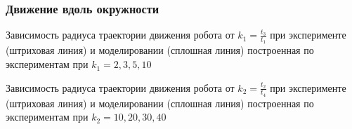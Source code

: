 \begin{frame}
\frametitle{Движение вдоль окружности}


\begin{minipage}[t]{0.47\linewidth}
	{Зависимость радиуса траектории движения робота от $k_1 = \frac{t_3}{t_1}$ при эксперименте (штриховая линия) и моделировании (сплошная линия) построенная по экспериментам при $k_1 = 2, 3, 5, 10$}
	\center{\texttt{[image: kRDependence+Theor\_T=3,W=max.eps]}}
\end{minipage}
\hfill
\begin{minipage}[t]{0.47\linewidth}
	{Зависимость радиуса траектории движения робота от $k_2 = \frac{t_2}{t_4}$ при эксперименте (штриховая линия) и моделировании (сплошная линия) построенная по экспериментам при $k_2 = 10, 20, 30, 40$}
\end{minipage}

\end{frame}


